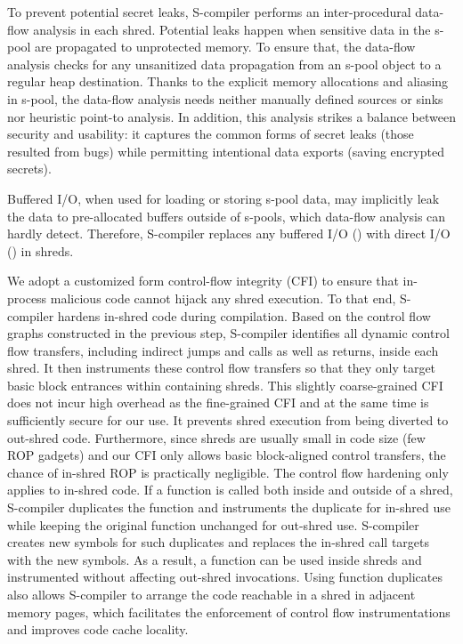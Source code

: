 To prevent potential secret leaks,
S-compiler performs an inter-procedural data-flow analysis in each shred.
Potential leaks happen when sensitive data in the s-pool are propagated to unprotected memory. 
To ensure that, the data-flow analysis 
checks for any unsanitized data propagation from an s-pool  object to a regular heap destination. 
Thanks to the explicit memory allocations and aliasing in s-pool, the data-flow analysis  needs neither manually defined sources or sinks nor heuristic point-to analysis. 
In addition, this analysis strikes a balance between security and usability: it captures the common forms of secret leaks (\eg those resulted from bugs) while permitting intentional data exports (\eg saving encrypted  secrets). 

Buffered I/O, when used for loading or storing s-pool data, may implicitly leak the data to pre-allocated buffers outside of s-pools, which data-flow analysis can hardly detect. Therefore, S-compiler replaces any buffered I/O () with direct I/O () in shreds. 


We adopt a customized form control-flow integrity (CFI) to ensure that in-process malicious code cannot hijack any shred execution. To that end, S-compiler hardens in-shred code during compilation. Based on the control flow graphs constructed in the previous step, S-compiler identifies all dynamic control flow transfers, including indirect jumps and calls as well as returns, inside each shred. It then instruments these control flow transfers so that they only target basic block  entrances within containing shreds. 
This slightly coarse-grained CFI does not incur high overhead as the fine-grained CFI and at the same time is sufficiently secure for our use. It prevents shred execution from being diverted to out-shred code. Furthermore, since shreds are usually small in code size (\ie few ROP gadgets) and our CFI only allows basic block-aligned control transfers, the chance of in-shred ROP is practically negligible. 
The control flow hardening only applies to in-shred code. If a function is called both inside and outside of a shred,
S-compiler duplicates the function and instruments the duplicate for in-shred use while keeping the original function unchanged for out-shred use. S-compiler creates new symbols for such duplicates and replaces the in-shred call targets with the new symbols. As a result, a function can be used inside shreds and instrumented without affecting out-shred invocations. Using function duplicates also allows S-compiler to arrange the code reachable in a shred in adjacent memory pages, which facilitates the enforcement of control flow instrumentations and improves code cache locality.

